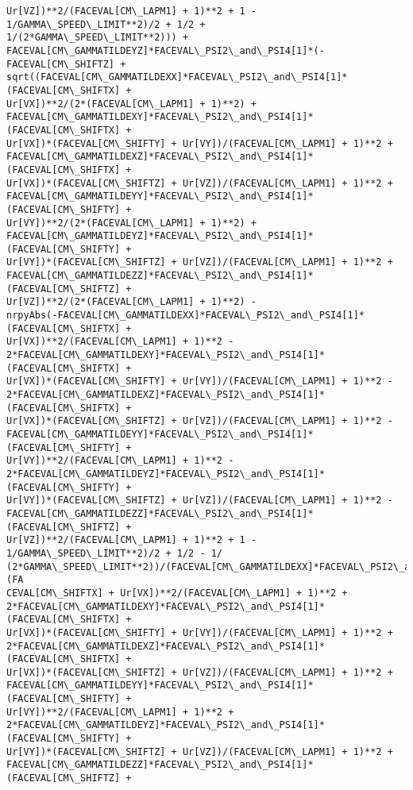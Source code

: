 \documentclass[landscape,letterpaper,10pt,english]{article}
\begin{document}
\begin{Verbatim}[commandchars=\\\{\}]
Ur[VZ])**2/(FACEVAL[CM\_LAPM1] + 1)**2 + 1 - 1/GAMMA\_SPEED\_LIMIT**2)/2 + 1/2 +
1/(2*GAMMA\_SPEED\_LIMIT**2))) +
FACEVAL[CM\_GAMMATILDEYZ]*FACEVAL\_PSI2\_and\_PSI4[1]*(-FACEVAL[CM\_SHIFTZ] +
sqrt((FACEVAL[CM\_GAMMATILDEXX]*FACEVAL\_PSI2\_and\_PSI4[1]*(FACEVAL[CM\_SHIFTX] +
Ur[VX])**2/(2*(FACEVAL[CM\_LAPM1] + 1)**2) +
FACEVAL[CM\_GAMMATILDEXY]*FACEVAL\_PSI2\_and\_PSI4[1]*(FACEVAL[CM\_SHIFTX] +
Ur[VX])*(FACEVAL[CM\_SHIFTY] + Ur[VY])/(FACEVAL[CM\_LAPM1] + 1)**2 +
FACEVAL[CM\_GAMMATILDEXZ]*FACEVAL\_PSI2\_and\_PSI4[1]*(FACEVAL[CM\_SHIFTX] +
Ur[VX])*(FACEVAL[CM\_SHIFTZ] + Ur[VZ])/(FACEVAL[CM\_LAPM1] + 1)**2 +
FACEVAL[CM\_GAMMATILDEYY]*FACEVAL\_PSI2\_and\_PSI4[1]*(FACEVAL[CM\_SHIFTY] +
Ur[VY])**2/(2*(FACEVAL[CM\_LAPM1] + 1)**2) +
FACEVAL[CM\_GAMMATILDEYZ]*FACEVAL\_PSI2\_and\_PSI4[1]*(FACEVAL[CM\_SHIFTY] +
Ur[VY])*(FACEVAL[CM\_SHIFTZ] + Ur[VZ])/(FACEVAL[CM\_LAPM1] + 1)**2 +
FACEVAL[CM\_GAMMATILDEZZ]*FACEVAL\_PSI2\_and\_PSI4[1]*(FACEVAL[CM\_SHIFTZ] +
Ur[VZ])**2/(2*(FACEVAL[CM\_LAPM1] + 1)**2) -
nrpyAbs(-FACEVAL[CM\_GAMMATILDEXX]*FACEVAL\_PSI2\_and\_PSI4[1]*(FACEVAL[CM\_SHIFTX] +
Ur[VX])**2/(FACEVAL[CM\_LAPM1] + 1)**2 -
2*FACEVAL[CM\_GAMMATILDEXY]*FACEVAL\_PSI2\_and\_PSI4[1]*(FACEVAL[CM\_SHIFTX] +
Ur[VX])*(FACEVAL[CM\_SHIFTY] + Ur[VY])/(FACEVAL[CM\_LAPM1] + 1)**2 -
2*FACEVAL[CM\_GAMMATILDEXZ]*FACEVAL\_PSI2\_and\_PSI4[1]*(FACEVAL[CM\_SHIFTX] +
Ur[VX])*(FACEVAL[CM\_SHIFTZ] + Ur[VZ])/(FACEVAL[CM\_LAPM1] + 1)**2 -
FACEVAL[CM\_GAMMATILDEYY]*FACEVAL\_PSI2\_and\_PSI4[1]*(FACEVAL[CM\_SHIFTY] +
Ur[VY])**2/(FACEVAL[CM\_LAPM1] + 1)**2 -
2*FACEVAL[CM\_GAMMATILDEYZ]*FACEVAL\_PSI2\_and\_PSI4[1]*(FACEVAL[CM\_SHIFTY] +
Ur[VY])*(FACEVAL[CM\_SHIFTZ] + Ur[VZ])/(FACEVAL[CM\_LAPM1] + 1)**2 -
FACEVAL[CM\_GAMMATILDEZZ]*FACEVAL\_PSI2\_and\_PSI4[1]*(FACEVAL[CM\_SHIFTZ] +
Ur[VZ])**2/(FACEVAL[CM\_LAPM1] + 1)**2 + 1 - 1/GAMMA\_SPEED\_LIMIT**2)/2 + 1/2 - 1/
(2*GAMMA\_SPEED\_LIMIT**2))/(FACEVAL[CM\_GAMMATILDEXX]*FACEVAL\_PSI2\_and\_PSI4[1]*(FA
CEVAL[CM\_SHIFTX] + Ur[VX])**2/(FACEVAL[CM\_LAPM1] + 1)**2 +
2*FACEVAL[CM\_GAMMATILDEXY]*FACEVAL\_PSI2\_and\_PSI4[1]*(FACEVAL[CM\_SHIFTX] +
Ur[VX])*(FACEVAL[CM\_SHIFTY] + Ur[VY])/(FACEVAL[CM\_LAPM1] + 1)**2 +
2*FACEVAL[CM\_GAMMATILDEXZ]*FACEVAL\_PSI2\_and\_PSI4[1]*(FACEVAL[CM\_SHIFTX] +
Ur[VX])*(FACEVAL[CM\_SHIFTZ] + Ur[VZ])/(FACEVAL[CM\_LAPM1] + 1)**2 +
FACEVAL[CM\_GAMMATILDEYY]*FACEVAL\_PSI2\_and\_PSI4[1]*(FACEVAL[CM\_SHIFTY] +
Ur[VY])**2/(FACEVAL[CM\_LAPM1] + 1)**2 +
2*FACEVAL[CM\_GAMMATILDEYZ]*FACEVAL\_PSI2\_and\_PSI4[1]*(FACEVAL[CM\_SHIFTY] +
Ur[VY])*(FACEVAL[CM\_SHIFTZ] + Ur[VZ])/(FACEVAL[CM\_LAPM1] + 1)**2 +
FACEVAL[CM\_GAMMATILDEZZ]*FACEVAL\_PSI2\_and\_PSI4[1]*(FACEVAL[CM\_SHIFTZ] +

\end{Verbatim}
\end{document}
